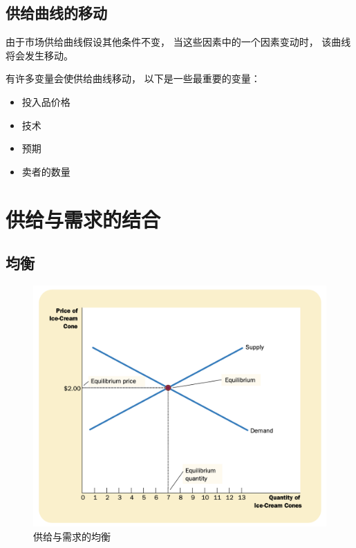 \subsection{供给曲线的移动}


由于市场供给曲线假设其他条件不变，
当这些因素中的一个因素变动时，
该曲线将会发生移动。



有许多变量会使供给曲线移动，
以下是一些最重要的变量：
\begin{itemize}
\item 投入品价格
\item 技术
\item 预期
\item 卖者的数量
\end{itemize}


\section{供给与需求的结合}

\subsection{均衡}

\begin{figure}[!ht]
  \centering
  \includegraphics[width=\textwidth]{pics/equilibrium-of-supply-and-demand}
  \caption{供给与需求的均衡}
  \label{fig:equilibrium-of-supply-and-demand}
\end{figure}

